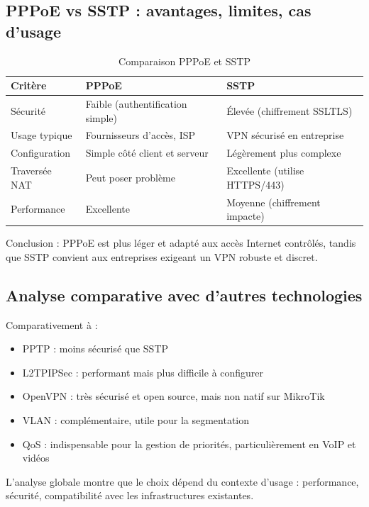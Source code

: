 \subsection{\gls{PPPoE} vs \gls{SSTP} : avantages, limites, cas d’usage}

\begin{table}[h!]
\centering
\caption{Comparaison \gls{PPPoE} et \gls{SSTP}}
\begin{tabular}{|l|l|l|}
\hline
\textbf{Critère} & {\gls{PPPoE}} & {\gls{SSTP}} \\ \hline
Sécurité & Faible (authentification simple) & Élevée (chiffrement \gls{SSL}\/\gls{TLS}) \\ \hline
Usage typique & Fournisseurs d’accès, \gls{ISP} & \gls{VPN} sécurisé en entreprise \\ \hline
Configuration & Simple côté client et serveur & Légèrement plus complexe \\ \hline
Traversée \gls{NAT} & Peut poser problème & Excellente (utilise \gls{HTTPS}/443) \\ \hline
Performance & Excellente & Moyenne (chiffrement impacte) \\ \hline
\end{tabular}
\end{table}

Conclusion : \gls{PPPoE} est plus léger et adapté aux accès Internet contrôlés, tandis que 
\gls{SSTP} convient aux entreprises exigeant un \gls{VPN} robuste et discret.

\subsection{Analyse comparative avec d'autres technologies}
Comparativement à : 
\begin{itemize}
    \item \gls{PPTP} : moins sécurisé que \gls{SSTP}
    \item \gls{L2TP}\/\gls{IPSec} : performant mais plus difficile à configurer
    \item \gls{OpenVPN} : très sécurisé et open source, mais non natif sur MikroTik
    \item \gls{VLAN} : complémentaire, utile pour la segmentation 
    \item \gls{QoS} : indispensable pour la gestion de priorités, particulièrement en VoIP et vidéos
\end{itemize}

L’analyse globale montre que le choix dépend du contexte d’usage : performance, 
sécurité, compatibilité avec les infrastructures existantes.

